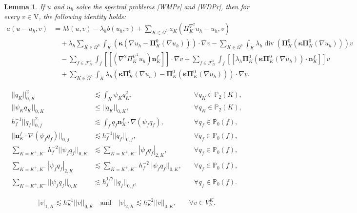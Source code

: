\documentclass[10pt,a4paper]{amsart}
\newtheorem{lemma}{Lemma}
\def\bPi{\mathbf{\Pi}}
\def\bkappa{\boldsymbol{\kappa}}
\def\bn{\boldsymbol{n}}
\newcommand\cF{\mathcal{F}}
\newcommand{\jump}[1]{[\![#1]\!]}
\def\rV{\mathrm{V}}
\newcommand\vdiv{\mathop{\mathrm{div}}\nolimits}
\begin{document}
\begin{lemma}\label{Lem13ApVEP}
    If  $u$ and $u_h$ solve the spectral problems \eqref{WMPr} and \eqref{WDPr}, then for every $v\in  \rV$, the following identity holds:
    \begin{align*}
        a(u-u_h,v) &= \lambda b(u,v)-\lambda_h b( u_h,v) + \sum_{K\in \Omega^h} a_K(\Pi_K^{\nabla^2} u_h-u_h,v) \\
        &\quad + \lambda_h \sum_{K\in \Omega^h} \int_K (\bkappa(\nabla u_h - \bPi_K^0 (\nabla u_h)))\cdot \nabla v - \sum_{K\in \Omega^h} \int_{K}\lambda_h \vdiv\left( \bPi_K^0 (\bkappa \bPi_K^0(\nabla u_h))\right) v \\
        &\quad - \sum_{f\in \cF^h_\Omega} \int_f \jump{(\nabla^2\Pi_K^{\nabla^2} u_h )\bn_K^f}\cdot \nabla v + \sum_{f\in \mathcal{F}^h_\Omega} \int_f
        \jump{\lambda_h\bPi_K^0(\bkappa \bPi_K^0(\nabla u_h ))\cdot \bn_K^{f}}v \\
        &\quad + \sum_{K\in \Omega^h}\int_K \lambda_h \left(\bkappa \bPi_K^0(\nabla u_h)-\bPi_K^0(\bkappa \bPi_K^0(\nabla u_h))\right) \cdot \nabla v.
    \end{align*}
\end{lemma}

\begin{align}
||q_K||_{0,K}^2&\lesssim \int_K \psi_K q_K^2, &\quad \forall q_K\in \mathbb{P}_2(K),\label{bubb1}\\
||\psi_Kq_K||_{0,K} &\leq ||q_K||_{0,K}, &\quad \forall q_K\in \mathbb{P}_2(K),\label{bubb2}\\
h_f^{-1}||q_f||_{0,f}^2&\lesssim \int_f q_f \mathbf{n}^f_{K} \cdot \nabla(\psi_f q_f), &\quad \forall q_f\in \mathbb{P}_0(f),\label{bubb1Edge}\\
%
||\mathbf{n}^f_{K} \cdot \nabla(\psi_f q_f)||_{0,f} &\lesssim h^{-1}_f||q_f||_{0,f}, &\quad \forall q_f\in \mathbb{P}_0(f),\label{bubb2Edge}\\
\sum_{K=K^+,K^-} h_f^{-2}||\psi_f q_f||_{0,K}&\lesssim \sum_{K=K^+,K^-} |\psi_f q_f|_{2,K}, &\quad \forall q_f\in \mathbb{P}_0(f),\label{bubb3Edge} \\
\sum_{K=K^+,K^-} |\psi_f q_f|_{2,K}&\lesssim \sum_{K=K^+,K^-} h_f^{-2}||\psi_f q_f||_{0,K}, &\quad \forall q_f\in \mathbb{P}_0(f),\label{bubb3_5Edge} \\
\sum_{K=K^+,K^-} ||\psi_f q_f||_{0,K}&\lesssim h_f^{1/2}||q_f||_{0,f}, &\quad\forall q_f\in \mathbb{P}_0(f).\label{bubb4Edge}
\end{align}

\begin{align}
 | v|_{1,K}\lesssim h_K^{-1}||v||_{0,K} 
\quad
\mbox{and}
\quad 
 | v|_{2,K}\lesssim h_K^{-2}||v||_{0,K},
 &\quad \forall v\in  V_h^K .\label{bubb3}
\end{align}
\end{document}
